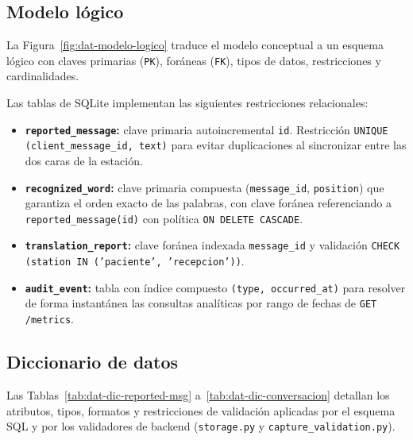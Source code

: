 \subsection{Modelo lógico}

La Figura~\ref{fig:dat-modelo-logico} traduce el modelo conceptual a un esquema
lógico con claves primarias (\texttt{PK}), foráneas (\texttt{FK}), tipos de datos,
restricciones y cardinalidades.


Las tablas de SQLite implementan las siguientes restricciones relacionales:
\begin{itemize}[leftmargin=*, itemsep=2pt]
    \item \textbf{\texttt{reported\_message}:} clave primaria autoincremental
    \texttt{id}. Restricción \texttt{UNIQUE (client\_message\_id, text)} para
    evitar duplicaciones al sincronizar entre las dos caras de la estación.
    \item \textbf{\texttt{recognized\_word}:} clave primaria compuesta
    (\texttt{message\_id}, \texttt{position}) que garantiza el orden exacto de
    las palabras, con clave foránea referenciando a \texttt{reported\_message(id)}
    con política \texttt{ON DELETE CASCADE}.
    \item \textbf{\texttt{translation\_report}:} clave foránea indexada
    \texttt{message\_id} y validación \texttt{CHECK (station IN ('paciente', 'recepcion'))}.
    \item \textbf{\texttt{audit\_event}:} tabla con índice compuesto
    \texttt{(type, occurred\_at)} para resolver de forma instantánea las
    consultas analíticas por rango de fechas de \texttt{GET /metrics}.
\end{itemize}

\subsection{Diccionario de datos}

Las Tablas~\ref{tab:dat-dic-reported-msg} a~\ref{tab:dat-dic-conversacion}
detallan los atributos, tipos, formatos y restricciones de validación aplicadas
por el esquema SQL y por los validadores de backend (\texttt{storage.py} y
\texttt{capture\_validation.py}).

